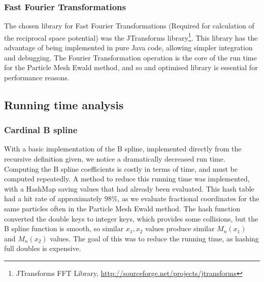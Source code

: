 \documentclass[pdftex,twoside,a4paper]{report}
\newcommand{\pmem}{Particle Mesh Ewald method}
\begin{document}
\subsubsection{Fast Fourier Transformations}
The chosen library for Fast Fourier Transformations (Required for calculation of the reciprocal space potential) was the JTransforms library\footnote{JTransforms FFT Library, \url{http://sourceforge.net/projects/jtransforms}}. This library has the advantage of being implemented in pure Java code, allowing simpler integration and debugging. The Fourier Transformation operation is the core of the run time for the \pmem{}, and so and optimised library is essential for performance reasons.
\subsection{Running time analysis}
\subsubsection{Cardinal B spline}
\label{sec:optimisations}
With a basic implementation of the B spline, implemented directly from the recursive definition given, we notice a dramatically decreased run time. Computing the B spline coefficients is costly in terms of time, and must be computed repeatedly. A method to reduce this running time was implemented, with a HashMap saving values that had already been evaluated. This hash table had a hit rate of approximately $98\%$, as we evaluate fractional coordinates for the same particles often in the \pmem. The hash function converted the double keys to integer keys, which provides some collisions, but the B spline function is smooth, so similar $x_1, x_2$ values produce similar $M_n(x_1)$ and $M_n(x_2)$ values. The goal of this was to reduce the running time, as hashing full doubles is expensive.
\end{document}
